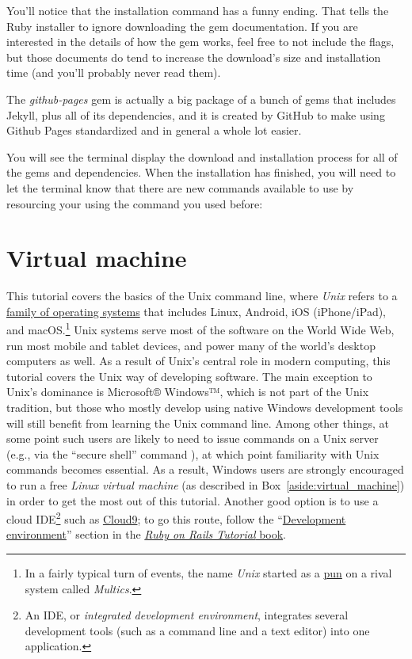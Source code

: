 You'll notice that the installation command has a funny ending. That  tells the Ruby installer to ignore downloading the gem documentation. If you are interested in the details of how the gem works, feel free to not include the flags, but those documents do tend to increase the download's size and installation time (and you'll probably never read them).

The \emph{github-pages} gem is actually a big package of a bunch of gems that includes Jekyll, plus all of its dependencies, and it is created by GitHub to make using Github Pages standardized and in general a whole lot easier.

You will see the terminal display the download and installation process for all of the gems and dependencies. When the installation has finished, you will need to let the terminal know that there are new commands available to use by resourcing your  using the command you used before:





\section{Virtual machine} %
\label{sec:virtual_machine}


This tutorial covers the basics of the Unix command line, where \emph{Unix} refers to a \href{https://en.wikipedia.org/wiki/Unix}{family of operating systems} that includes Linux, Android, iOS (iPhone/iPad), and macOS\@.\footnote{In a fairly typical turn of events, the name \emph{Unix} started as a \href{http://www.catb.org/jargon/html/U/Unix.html}{pun} on a rival system called \emph{Multics}.} Unix systems serve most of the software on the World Wide Web, run most mobile and tablet devices, and power many of the world's desktop computers as well. As a result of Unix's central role in modern computing, this tutorial covers the Unix way of developing software. The main exception to Unix's dominance is Microsoft® Windows™, which is not part of the Unix tradition, but those who mostly develop using native Windows development tools will still benefit from learning the Unix command line. Among other things, at some point such users are likely to need to issue commands on a Unix server (e.g., via the ``secure shell'' command ), at which point familiarity with Unix commands becomes essential. As a result, Windows users are strongly encouraged to run a free \emph{Linux virtual machine} (as described in Box~\ref{aside:virtual_machine}) in order to get the most out of this tutorial. Another good option is to use a cloud IDE\footnote{An IDE, or \emph{integrated development environment}, integrates several development tools (such as a command line and a text editor) into one application.} such as \href{http://c9.io/}{Cloud9}; to go this route, follow the ``\href{https://www.railstutorial.org/book/beginning#sec-development_environment}{Development environment}'' section in the \href{http://railstutorial.org/book}{\emph{Ruby on Rails Tutorial} book}.

